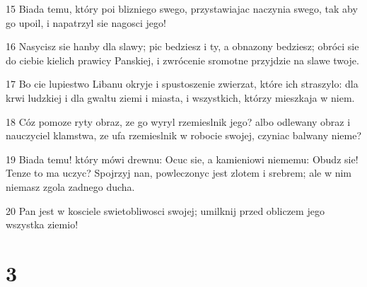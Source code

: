 \par 15 Biada temu, który poi blizniego swego, przystawiajac naczynia swego, tak aby go upoil, i napatrzyl sie nagosci jego!
\par 16 Nasycisz sie hanby dla slawy; pic bedziesz i ty, a obnazony bedziesz; obróci sie do ciebie kielich prawicy Panskiej, i zwrócenie sromotne przyjdzie na slawe twoje.
\par 17 Bo cie lupiestwo Libanu okryje i spustoszenie zwierzat, które ich straszylo: dla krwi ludzkiej i dla gwaltu ziemi i miasta, i wszystkich, którzy mieszkaja w niem.
\par 18 Cóz pomoze ryty obraz, ze go wyryl rzemieslnik jego? albo odlewany obraz i nauczyciel klamstwa, ze ufa rzemieslnik w robocie swojej, czyniac balwany nieme?
\par 19 Biada temu! który mówi drewnu: Ocuc sie, a kamieniowi niememu: Obudz sie! Tenze to ma uczyc? Spojrzyj nan, powleczonyc jest zlotem i srebrem; ale w nim niemasz zgola zadnego ducha.
\par 20 Pan jest w kosciele swietobliwosci swojej; umilknij przed obliczem jego wszystka ziemio!

\chapter{3}

